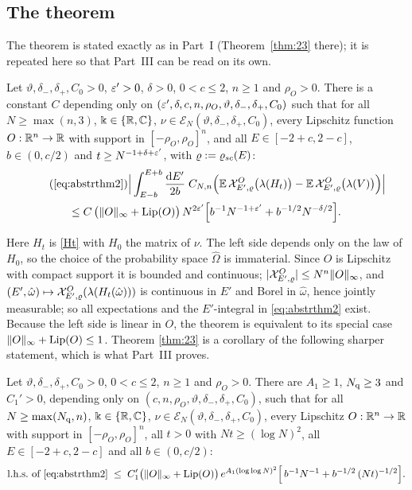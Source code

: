 \subsection{The theorem}

The theorem is stated exactly as in Part~I (Theorem~\ref{thm:23} there); it is repeated here so that Part~III can be read on its own.

\renewcommand{\restatedname}{Theorem~\ref*{thm:23}}
\begin{restated}
Let $\vartheta,\delta_-,\delta_+,C_0>0$, $\varepsilon'>0$, $\delta>0$, $0<c\le2$, $n\ge1$ and $\rho_O>0$.
There is a constant $C$ depending only on $(\varepsilon',\delta,c,n,\rho_O,\vartheta,\delta_-,\delta_+,C_0)$ such that for all $N\ge\max(n,3)$,
$\Bbbk\in\{\mathbb{R},\mathbb{C}\}$, $\nu\in\mathcal E_N(\vartheta,\delta_-,\delta_+,C_0)$, every Lipschitz function $O:\mathbb{R}^n\to\mathbb{R}$ with support in $[-\rho_O,\rho_O]^n$, and all
$E\in[-2+c,2-c]$, $b\in(0,c/2)$ and $t\ge N^{-1+\delta+\varepsilon'}$, with $\varrho:=\varrho_{sc}(E)$:
\begin{multline}\tag{\ref*{eq:abstrthm2}}
 \Big|\int_{E-b}^{E+b}\frac{\rd E'}{2b}\;C_{N,n}\Big(\E\,\cX^{O}_{E',\varrho}\big(\lambda(H_t)\big)-\E\,\cX^{O}_{E',\varrho}\big(\lambda(V)\big)\Big)\Big|\\
 \le C\,\big(\|O\|_\infty+\Lip(O)\big)\,N^{2\eps'}\Big[b^{-1}N^{-1+\eps'}+b^{-1/2}N^{-\delta/2}\Big].
\end{multline}
\end{restated}

\noindent Here $H_t$ is \eqref{Ht} with $H_0$ the matrix of $\nu$. The left side depends only on the law of $H_0$, so the choice of the probability space $\widehat\Omega$ is immaterial.
Since $O$ is Lipschitz with compact support it is bounded and continuous; $|\mathcal{X}^O_{E',\varrho}|\le N^n\|O\|_\infty$, and $(E',\hat\omega)\mapsto\mathcal{X}^O_{E',\varrho}(\lambda(H_t(\hat\omega)))$ is continuous in $E'$ and Borel in $\hat\omega$, hence jointly measurable;
so all expectations and the $E'$-integral in \eqref{eq:abstrthm2} exist. Because the left side is linear in $O$, the theorem is equivalent to its special case $\|O\|_\infty+\operatorname{Lip}(O)\le1$.
Theorem \ref{thm:23} is a corollary of the following sharper statement, which is what Part~III proves.

\begin{theorem}\label{thm:sharp}
Let $\vartheta,\delta_-,\delta_+,C_0>0$, $0<c\le2$, $n\ge1$ and $\rho_O>0$. There are $A_1\ge1$, $N_{\rm q}\ge3$ and $C_1'>0$, depending only on
$(c,n,\rho_O,\vartheta,\delta_-,\delta_+,C_0)$, such that for all $N\ge\max(N_{\rm q},n)$, $\Bbbk\in\{\mathbb{R},\mathbb{C}\}$, $\nu\in\mathcal E_N(\vartheta,\delta_-,\delta_+,C_0)$, every Lipschitz $O:\mathbb{R}^n\to\mathbb{R}$ with support in $[-\rho_O,\rho_O]^n$, all $t>0$ with $Nt\ge (\log N)^{2}$,
all $E\in[-2+c,2-c]$ and all $b\in(0,c/2)$:
\begin{equation}\label{sharp}
\text{l.h.s.\ of \eqref{eq:abstrthm2}}\;\le\;C_1'\big(\|O\|_\infty+\operatorname{Lip}(O)\big)\,e^{A_1(\log\log N)^2}\Big[\,b^{-1}N^{-1}+b^{-1/2}\,(Nt)^{-1/2}\Big].
\end{equation}
\end{theorem}

